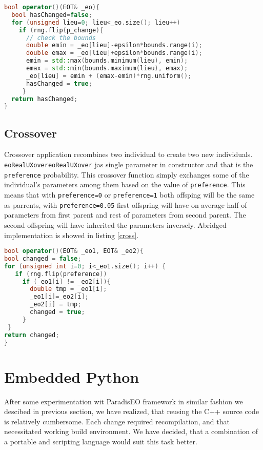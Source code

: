 \documentclass[12pt,oneside]{fithesis2}
\begin{document}
\begin{lstlisting}[language=C++,label=mutate,caption=Individual mutation]
bool operator()(EOT& _eo){
  bool hasChanged=false;
  for (unsigned lieu=0; lieu<_eo.size(); lieu++)
    if (rng.flip(p_change){
      // check the bounds
      double emin = _eo[lieu]-epsilon*bounds.range(i);
      double emax = _eo[lieu]+epsilon*bounds.range(i);
      emin = std::max(bounds.minimum(lieu), emin);
      emax = std::min(bounds.maximum(lieu), emax);
      _eo[lieu] = emin + (emax-emin)*rng.uniform();
      hasChanged = true;
     }
  return hasChanged;
}
\end{lstlisting}

\subsection{Crossover}
Crossover application recombines two individual to create two new individuals. \lstinline$eoRealUXovereoRealUXover$ jas single parameter in constructor and that is the \lstinline$preference$ probability. This crossover function simply exchanges some of the individual's parameters among them based on the value  of \lstinline$preference$. This means that with \lstinline$preference=0$ or  \lstinline$preference=1$ both offsping will be the same as parrents, with \lstinline$preference=0.05$ first offspring will have on average half of parameters from first parent and rest of parameters from second parent. The second offspring will have inherited the parameters inversely.  Abridged implementation is showed in listing \ref{cross}.

\begin{lstlisting}[language=C++,label=cross,caption=Individuals crossover]
bool operator()(EOT& _eo1, EOT& _eo2){
bool changed = false;
for (unsigned int i=0; i<_eo1.size(); i++) {
   if (rng.flip(preference))
     if (_eo1[i] != _eo2[i]){
       double tmp = _eo1[i];
       _eo1[i]=_eo2[i];
       _eo2[i] = tmp;
       changed = true;
     }
 }
return changed;
}
\end{lstlisting}

\section{Embedded Python}
After some experimentation wit ParadisEO framework in similar fashion we descibed in previous section, we have realized, that reusing the C++ source code is relatively cumbersome. Each change required recompilation, and that necessitated working build environment. We have decided, that a combination of a portable and scripting language would suit this task better. 
\end{document}
